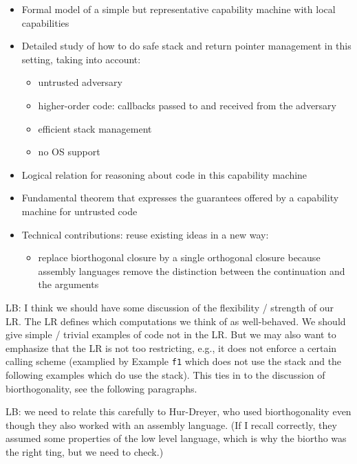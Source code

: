 \documentclass[compsoc,conference,letterpaper,fleqn]{IEEEtran}
\begin{document}
\begin{itemize}
\item Formal model of a simple but representative capability machine with local capabilities
\item Detailed study of how to do safe stack and return pointer management in this setting, taking into account:
\begin{itemize}
\item untrusted adversary
\item higher-order code: callbacks passed to and received from the adversary
\item efficient stack management
\item no OS support
\end{itemize}
\item Logical relation for reasoning about code in this capability machine
\item Fundamental theorem that expresses the guarantees offered by a capability machine for untrusted code
\item Technical contributions: reuse existing ideas in a new way:
\begin{itemize}
\item replace biorthogonal closure by a single orthogonal closure
because assembly languages remove the distinction between the
continuation and the arguments
\end{itemize}
\end{itemize}
LB: I think we should have some discussion of the flexibility /
  strength of our LR.  The LR defines which computations we think of
  as well-behaved.   
 We should give simple / trivial examples of
  code not in the LR. But we may also want to emphasize that the LR is 
  not too restricting, e.g., it does not enforce a certain calling
  scheme (examplied by Example \verb!f1! which
  does not use the stack and the following examples which do use the
  stack). This ties in to the discussion of biorthogonality, see the
  following paragraphs. 

LB: we need to relate this carefully to Hur-Dreyer, who used
      biorthogonality even though they also worked with an assembly
      language. (If I recall correctly, they assumed some properties
      of the low level language, which is why the biortho was the
      right ting, but we need to check.)
\end{document}
